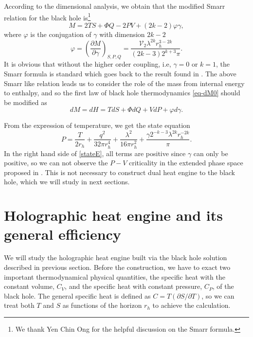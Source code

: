 \documentclass[preprint,showpacs,showkeys,onecolumn,nofootinbib]{revtex4}
\begin{document}
According to the dimensional analysis\cite{Kastor:2009wy}, we obtain that the modified Smarr relation for the black hole is\footnote{We thank Yen Chin Ong for the helpful discussion on the Smarr formula.}
\begin{equation}\label{eq-Smarr}
M=2TS+\Phi Q-2PV+(2k-2)\varphi \gamma,
\end{equation}
where $\varphi$ is the conjugation of $\gamma$ with dimension $2k-2$
 \begin{equation}
 \varphi=\left(\frac{\partial M}{\partial \gamma}\right)_{S,P,Q}=\frac{ \mathcal{V}_2 \lambda ^{2 k} r_h^{3-2k}}{ (2 k-3)2^{k+3}\pi}.
 \end{equation}
It is obvious that without the higher order coupling, i.e, $\gamma=0$ or $k=1$, the Smarr formula is standard which goes back to the result found in \cite{Fang:2017nse}.
The above Smarr like relation leads us to consider  the role of the mass from internal energy to enthalpy, and so  the first law of black hole
thermodynamics \eqref{eq-dM0} should be modified as
\begin{equation}\label{eq-dM}
d M=dH=T dS+\Phi dQ+V dP+\varphi d\gamma.
\end{equation}



From the expression of temperature, we get the state equation
\begin{equation}\label{stateE}
P =\frac{T}{2 r_h}+\frac{q^2}{32\pi  r_h^4}+\frac{\lambda ^2}{16 \pi  r_h^2}+\frac{\gamma  2^{-k-3} \lambda ^{2 k} r_h^{-2 k}}{\pi }.
\end{equation}
In the right hand side of \eqref{stateE}, all terms are positive since $\gamma$ can only be positive, so we can not observe the $P-V$ criticality in the extended phase space proposed in \cite{Chamblin:1999tk,Chamblin:1999hg,Kubiznak:2012wp}. This is not necessary to construct dual heat engine to the black hole, which we will study in next sections.

\section{Holographic heat engine and its general efficiency}\label{sec:engine}

We will study the holographic heat engine built via the black hole solution described in previous section.
Before the construction, we have to exact two important thermodynamical physical quantities, the specific heat with the constant volume, $C_V$, and the specific heat with constant pressure, $C_P$, of the black hole. The general specific heat is defined as  $C=T(\partial S/\partial T)$, so we can treat both $T$ and $S$ as functions of the horizon $r_h$ to achieve the calculation.
\end{document}
